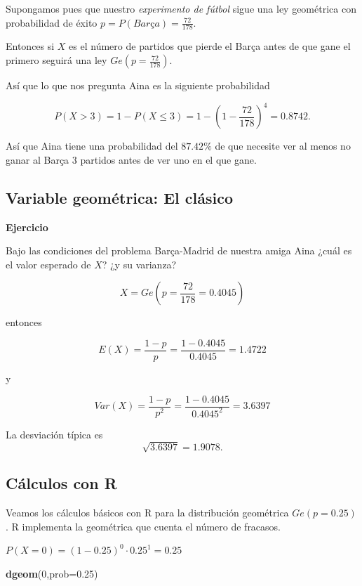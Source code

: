 \documentclass[]{book}
\newenvironment{Shaded}{\begin{snugshade}}{\end{snugshade}}
\newcommand{\DataTypeTok}[1]{\textcolor[rgb]{0.13,0.29,0.53}{#1}}
\newcommand{\DecValTok}[1]{\textcolor[rgb]{0.00,0.00,0.81}{#1}}
\newcommand{\FloatTok}[1]{\textcolor[rgb]{0.00,0.00,0.81}{#1}}
\newcommand{\KeywordTok}[1]{\textcolor[rgb]{0.13,0.29,0.53}{\textbf{#1}}}
\newcommand{\NormalTok}[1]{#1}
\begin{document}
Supongamos pues que nuestro \emph{experimento de fútbol} sigue una ley geométrica con probabilidad de éxito \(p=P(Barça)=\frac{72}{178}.\)

Entonces si \(X\) es el número de partidos que pierde el Barça antes de que gane el primero seguirá una ley \(Ge(p=\frac{72}{178})\).

Así que lo que nos pregunta Aina es la siguiente probabilidad

\[P(X>3)=1-P(X\leq 3)=1-\left(1-\frac{72}{178}\right)^4=0.8742.\]

Así que Aina tiene una probabilidad del \(87.42\%\) de que necesite ver al menos no ganar al Barça 3 partidos antes de ver uno en el que gane.

\hypertarget{variable-geomuxe9trica-el-cluxe1sico-1}{%
\subsection{Variable geométrica: El clásico}\label{variable-geomuxe9trica-el-cluxe1sico-1}}

\textbf{Ejercicio}

Bajo las condiciones del problema Barça-Madrid de nuestra amiga Aina ¿cuál es el valor esperado de \(X\)? ¿y su varianza?

\[X=Ge\left(p=\frac{72}{178}=0.4045\right)\]

entonces

\[E(X)=\frac{1-p}{p}=\frac{1-0.4045}{0.4045}=1.4722\]

y

\[Var(X)=\frac{1-p}{p^2}=\frac{1-0.4045}{0.4045^2}=3.6397\]

La desviación típica es
\[\sqrt{3.6397}=1.9078.\]

\hypertarget{cuxe1lculos-con-r}{%
\subsection{Cálculos con R}\label{cuxe1lculos-con-r}}

Veamos los cálculos básicos con R para la distribución geométrica \(Ge(p=0.25)\). R implementa la geométrica que cuenta el número de fracasos.

\(P(X=0)=(1-0.25)^0\cdot 0.25^1=0.25\)

\begin{Shaded}
\begin{Highlighting}[]
\KeywordTok{dgeom}\NormalTok{(}\DecValTok{0}\NormalTok{,}\DataTypeTok{prob=}\FloatTok{0.25}\NormalTok{)}
\end{Highlighting}
\end{Shaded}
\end{document}

